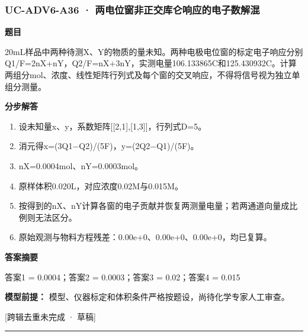 \documentclass[UTF8,11pt,a4paper]{ctexart}
\begin{document}
\subsubsection*{UC-ADV6-A36 · 两电位窗非正交库仑响应的电子数解混}
\noindent\textbf{题目}\par
20mL样品中两种待测X、Y的物质的量未知。两种电极电位窗的标定电子响应分别Q1/F=2nX+nY，Q2/F=nX+3nY，实测电量106.133865C和125.430932C。计算两组分mol、浓度、线性矩阵行列式及每个窗的交叉响应，不得将信号视为独立单组分测量。\par
\medskip\noindent\textbf{分步解答}
\begin{enumerate}
\item 设未知量x、y，系数矩阵[[2,1],[1,3]]，行列式D=5。
\item 消元得x=(3Q1−Q2)/(5F)，y=(2Q2−Q1)/(5F)。
\item nX=0.0004mol、nY=0.0003mol。
\item 原样体积0.020L，对应浓度0.02M与0.015M。
\item 按得到的nX、nY计算各窗的电子贡献并恢复两测量电量；若两通道向量成比例则无法区分。
\item 原始观测与物料方程残差：0.00e+0、0.00e+0、0.00e+0，均已复算。
\end{enumerate}
\noindent\textbf{答案摘要}\par
答案1 = 0.0004；答案2 = 0.0003；答案3 = 0.02；答案4 = 0.015\par
\noindent\textbf{模型前提：}
模型、仪器标定和体积条件严格按题设，尚待化学专家人工审查。\par
\noindent\textcolor{red!65!black}{[跨辑去重未完成 · 草稿]} \par
\medskip\hrule\medskip
{}
\end{document}

